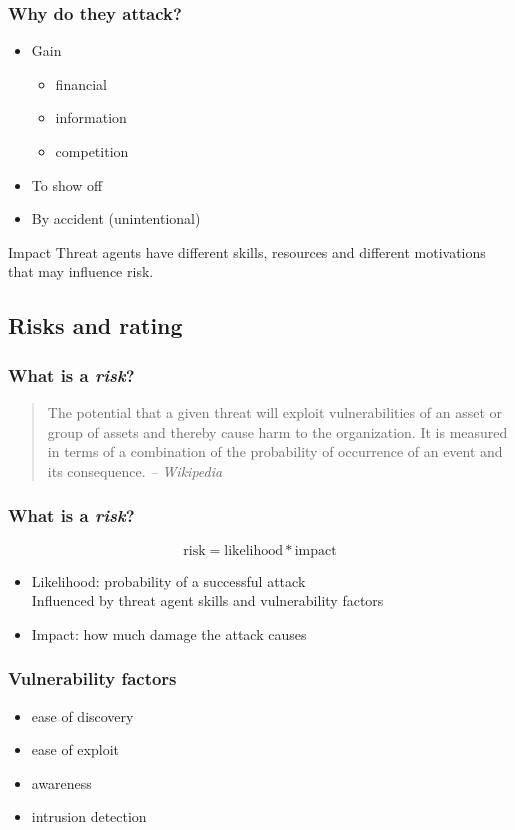 \begin{frame}
\frametitle{Why do they attack?}
\begin{itemize}
\item Gain
	\begin{itemize}
	\item financial
	\item information
	\item competition
	\end{itemize}
\item To show off
\item By accident (unintentional)
\end{itemize}
\begin{block}{Impact}
Threat agents have different skills, resources and different motivations that
may influence risk.
\end{block}
\end{frame}

\subsection{Risks and rating}

\begin{frame}
\frametitle{What is a \emph{risk}?}
\begin{quote}
The potential that a given threat will exploit vulnerabilities of
an asset or group of assets and thereby cause harm to the organization. It
is measured in terms of a combination of the probability of occurrence of an
event and its consequence.
\textit{-- Wikipedia}
\end{quote}
\end{frame}

\begin{frame}
\frametitle{What is a \emph{risk}?}
\[ \text{risk} = \text{likelihood} * \text{impact} \]
\begin{itemize}
\item Likelihood: probability of a successful attack
	\\ Influenced by threat agent skills and vulnerability factors
\item Impact: how much damage the attack causes
\end{itemize}
\end{frame}

\begin{frame}
\frametitle{Vulnerability factors}
\begin{itemize}
\item ease of discovery
\item ease of exploit
\item awareness
\item intrusion detection
\end{itemize}
\end{frame}

